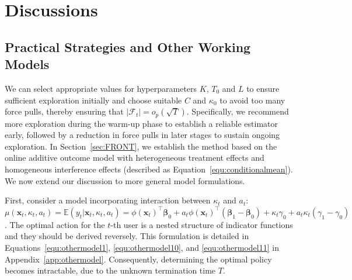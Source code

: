 \documentclass[12pt]{article}
\begin{document}
\section{Discussions}
\label{sec:dis}

\subsection{Practical Strategies and Other Working Models}
\label{sec:other}
We can select appropriate values for hyperparameters \( K \), \( T_0 \) and \( L \) to ensure sufficient exploration initially and choose suitable $C$ and $\kappa_0$ to avoid too many force pulls, thereby ensuring that $|\mathcal{F}_t| = o_p(\sqrt{T})$. Specifically, we recommend more exploration during the warm-up phase to establish a reliable estimator early, followed by a reduction in force pulls in later stages to sustain ongoing exploration. In Section~\ref{sec:FRONT}, we establish the method based on the online additive outcome model with heterogeneous treatment effects and homogeneous interference effects (described as Equation~\eqref{equ:conditionalmean}). We now extend our discussion to more general model formulations.

First, consider a model incorporating interaction between \(\kappa_t\) and \(a_t\): $\mu(\bm{x}_t, \kappa_t, a_t) = \mathbb{E}(y_t \vert \bm{x}_t, \kappa_t, a_t) = \phi(\bm{x}_t)^{\top}\bm{\beta}_0+a_t\phi(\bm{x}_t)^{\top}(\bm{\beta}_1-\bm{\beta}_0)+ \kappa_t\gamma_0 + a_t\kappa_t (\gamma_1-\gamma_0)$. The optimal action for the \(t\)-th user is a nested structure of indicator functions and they should be derived reversely. This formulation is detailed in Equations~\eqref{equ:othermodel1}, \eqref{equ:othermodel10}, and \eqref{equ:othermodel11} in Appendix~\ref{app:othermodel}. Consequently, determining the optimal policy becomes intractable, due to the unknown termination time $T$. 
\end{document}
